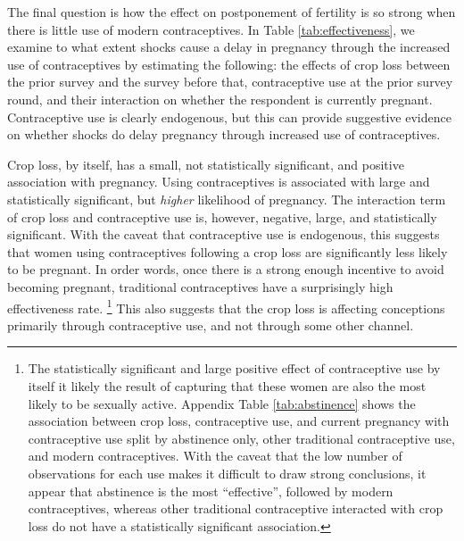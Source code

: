 \documentclass[letterpaper,12pt]{article}
\begin{document}


The final question is how the effect on postponement of fertility 
is so strong when there is little use of modern contraceptives.
In Table \ref{tab:effectiveness}, we examine to what extent shocks cause
a delay in pregnancy through the increased use of contraceptives by
estimating the following: 
the effects of crop loss between the prior survey and the
survey before that, contraceptive use at the prior survey round, and their
interaction on whether the respondent is currently pregnant.
Contraceptive use is clearly endogenous, but this can provide 
suggestive evidence on whether shocks do delay
pregnancy through increased use of contraceptives. 




Crop loss, by itself, has a small, not statistically significant,
and positive association with pregnancy.
Using contraceptives is associated with large and statistically 
significant, but \emph{higher} likelihood of pregnancy.
The interaction term of crop loss and contraceptive use is,
however, negative, large, and statistically significant. 
With the caveat that contraceptive use is endogenous, this suggests
that women using contraceptives following a crop loss are significantly 
less likely to be pregnant. 
In order words, once there is a strong enough incentive to avoid
becoming pregnant, traditional contraceptives have a surprisingly high
effectiveness rate.%
\footnote{
The statistically significant and large positive effect of 
contraceptive use by itself it likely the result of capturing
that these women are also the most likely to be sexually active.
Appendix Table \ref{tab:abstinence} shows the association 
between crop loss, contraceptive use, and current pregnancy with 
contraceptive use split by abstinence only, other traditional
contraceptive use, and modern contraceptives.
With the caveat that the low number of observations for each use 
makes it difficult to draw strong conclusions, it appear that
abstinence is the most ``effective'', followed by modern
contraceptives, whereas other traditional contraceptive interacted
with crop loss do not have a statistically significant association.
}
This also suggests that the crop loss is affecting conceptions primarily 
through contraceptive use, and not through some other channel.
\end{document}
